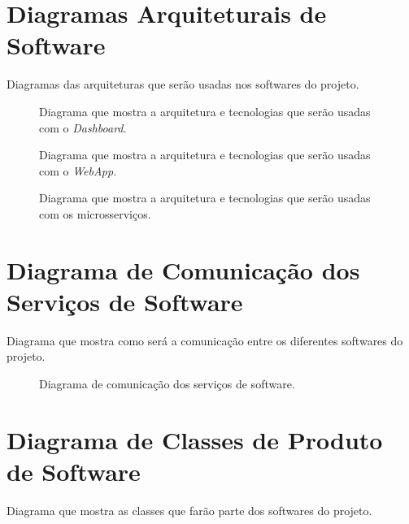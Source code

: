 \begin{apendicesenv}

\partapendices

\chapter{Diagramas Arquiteturais de Software}

Diagramas das arquiteturas que serão usadas nos softwares do projeto.

\begin{figure}[h]
	\caption{\label{fig:diagrama-arq-dashboard} Diagrama que mostra a arquitetura e tecnologias que serão usadas com o \textit{Dashboard}.}
\end{figure}\newpage

\begin{figure}[h]
	\caption{\label{fig:diagrama-arq-webApp} Diagrama que mostra a arquitetura e tecnologias que serão usadas com o \textit{WebApp}.}
\end{figure}\newpage

\begin{figure}[h]
	\caption{\label{fig:diagrama-arq-microsservicos} Diagrama que mostra a arquitetura e tecnologias que serão usadas com os microsserviços.}
\end{figure}\newpage

\chapter{Diagrama de Comunicação dos Serviços de Software}

Diagrama que mostra como será a comunicação entre os diferentes softwares do projeto.

\begin{figure}[h]
	\caption{\label{fig:diagrama-comm-soft} Diagrama de comunicação dos serviços de software.}
\end{figure}

\chapter{Diagrama de Classes de Produto de Software}

Diagrama que mostra as classes que farão parte dos softwares do projeto.


\end{apendicesenv}
